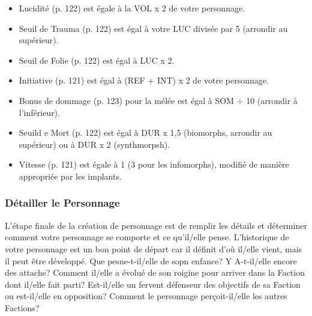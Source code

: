 \begin{itemize} \item Lucidité (p. 122) est égale à la VOL x 2 de votre personnage. \item Seuil de Trauma (p. 122) est égal à votre LUC divisée par 5 (arrondir au supérieur). \item Seuil de Folie (p. 122) est égal à LUC x 2. \item Initiative (p. 121) est égal à (REF + INT) x 2 de votre personnage. \item Bonus de dommage (p. 123) pour la mélée est égal à SOM $\div$ 10 (arrondir à l'inférieur). \item Seuild e Mort (p. 122) est égal à DUR x 1,5 (biomorphs, arrondir au supérieur) ou à DUR x 2 (synthmorpsh). \item Vitesse (p. 121) est égale à  1 (3 pour les infomorphs), modifié de manière appropriée par les implants. \end{itemize} 

\subsubsection{Détailler le Personnage} \label{sec:detailing-the-character} 

L'étape finale de la création de personnage est de remplir les détails et déterminer comment votre personnage se comporte et ce qu'il/elle pense. L'historique de votre personnage est un bon point de départ car il définit d'où il/elle vient, mais il peut être développé. Que pesne-t-il/elle de sopn enfance? Y A-t-il/elle encore des attache? Comment il/elle a évolué de son roigine pour arriver dans la Faction dont il/elle fait parti? Est-il/elle un fervent défenseur des objectifs de sa Faction ou est-il/elle en opposition? Comment le personnage perçoit-il/elle les autres Factions? 

